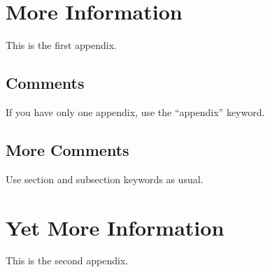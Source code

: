 \section{More Information}        %
This is the first appendix. 

\subsection{Comments}
If you have only one appendix, use the ``appendix'' keyword.

\subsection{More Comments}
Use section and subsection keywords as usual.

\section{Yet More Information}    %
This is the second appendix.
